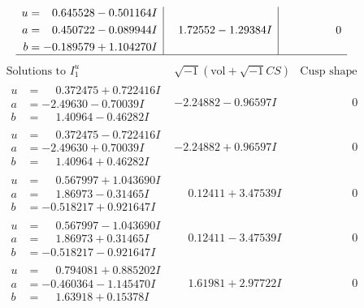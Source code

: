 \documentclass[1p]{elsarticle_modified}
\theoremstyle{definition}
\newcommand{\I}{\sqrt{-1}}
\begin{document}
$$\begin{array}{c|c|c}
\begin{aligned}
u &= \phantom{-}0.645528 - 0.501164 I \\
a &= \phantom{-}0.450722 - 0.089944 I \\
b &= -0.189579 + 1.104270 I\end{aligned}
 & \phantom{-}1.72552 - 1.29384 I & \phantom{-0.000000 } 0\\
 \hline 
 \end{array}$$\newpage$$\begin{array}{c|c|c}  
\text{Solutions to }I^u_{1}& \I (\text{vol} + \sqrt{-1}CS) & \text{Cusp shape}\\
 \hline 
\begin{aligned}
u &= \phantom{-}0.372475 + 0.722416 I \\
a &= -2.49630 - 0.70039 I \\
b &= \phantom{-}1.40964 - 0.46282 I\end{aligned}
 & -2.24882 - 0.96597 I & \phantom{-0.000000 } 0 \\ \hline\begin{aligned}
u &= \phantom{-}0.372475 - 0.722416 I \\
a &= -2.49630 + 0.70039 I \\
b &= \phantom{-}1.40964 + 0.46282 I\end{aligned}
 & -2.24882 + 0.96597 I & \phantom{-0.000000 } 0 \\ \hline\begin{aligned}
u &= \phantom{-}0.567997 + 1.043690 I \\
a &= \phantom{-}1.86973 - 0.31465 I \\
b &= -0.518217 + 0.921647 I\end{aligned}
 & \phantom{-}0.12411 + 3.47539 I & \phantom{-0.000000 } 0 \\ \hline\begin{aligned}
u &= \phantom{-}0.567997 - 1.043690 I \\
a &= \phantom{-}1.86973 + 0.31465 I \\
b &= -0.518217 - 0.921647 I\end{aligned}
 & \phantom{-}0.12411 - 3.47539 I & \phantom{-0.000000 } 0 \\ \hline\begin{aligned}
u &= \phantom{-}0.794081 + 0.885202 I \\
a &= -0.460364 - 1.145470 I \\
b &= \phantom{-}1.63918 + 0.15378 I\end{aligned}
 & \phantom{-}1.61981 + 2.97722 I & \phantom{-0.000000 } 0 \\ \hline\begin{aligned}

\end{aligned}
\end{array}$$
\end{document}
